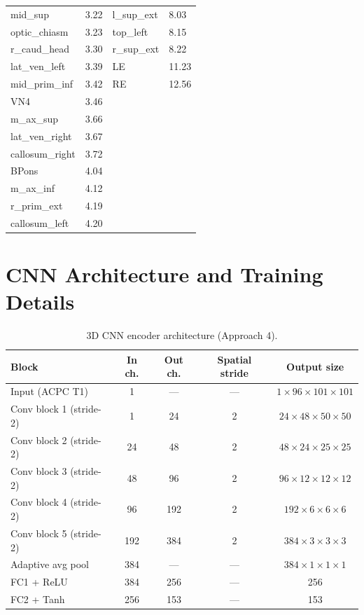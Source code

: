 \documentclass[11pt,letterpaper]{article}
\begin{document}
\begin{table}[h]
\begin{tabular}{llll}
mid\_sup               & 3.22 & l\_sup\_ext            & 8.03 \\
optic\_chiasm          & 3.23 & top\_left              & 8.15 \\
r\_caud\_head          & 3.30 & r\_sup\_ext            & 8.22 \\
lat\_ven\_left         & 3.39 & LE                     & 11.23 \\
mid\_prim\_inf         & 3.42 & RE                     & 12.56 \\
VN4                    & 3.46 &                        &       \\
m\_ax\_sup             & 3.66 &                        &       \\
lat\_ven\_right        & 3.67 &                        &       \\
callosum\_right        & 3.72 &                        &       \\
BPons                  & 4.04 &                        &       \\
m\_ax\_inf             & 4.12 &                        &       \\
r\_prim\_ext           & 4.19 &                        &       \\
callosum\_left         & 4.20 &                        &       \\
\bottomrule
\end{tabular}
\end{table}

\newpage
\section{CNN Architecture and Training Details}
\label{app:cnn}

\begin{table}[h]
\centering
\caption{3D CNN encoder architecture (Approach 4).}
\small
\begin{tabular}{lcccc}
\toprule
\textbf{Block} & \textbf{In ch.} & \textbf{Out ch.} & \textbf{Spatial stride} & \textbf{Output size} \\
\midrule
Input (ACPC T1) & 1 & — & — & $1 \times 96 \times 101 \times 101$ \\
Conv block 1 (stride-2) & 1 & 24 & 2 & $24 \times 48 \times 50 \times 50$ \\
Conv block 2 (stride-2) & 24 & 48 & 2 & $48 \times 24 \times 25 \times 25$ \\
Conv block 3 (stride-2) & 48 & 96 & 2 & $96 \times 12 \times 12 \times 12$ \\
Conv block 4 (stride-2) & 96 & 192 & 2 & $192 \times 6 \times 6 \times 6$ \\
Conv block 5 (stride-2) & 192 & 384 & 2 & $384 \times 3 \times 3 \times 3$ \\
Adaptive avg pool & 384 & — & — & $384 \times 1 \times 1 \times 1$ \\
FC1 + ReLU & 384 & 256 & — & 256 \\
FC2 + Tanh & 256 & 153 & — & 153 \\
\bottomrule
\end{tabular}
\end{table}
\end{document}
